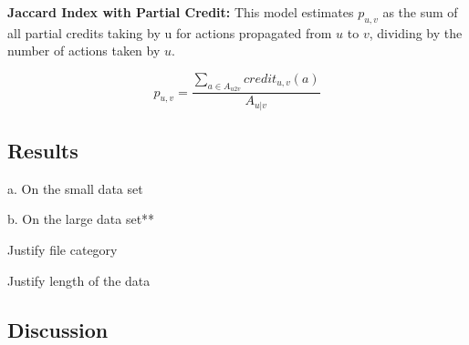 \textbf{Jaccard Index with Partial Credit:} This model estimates $p_{u,v}$ as the sum of all partial credits taking by u for actions propagated from $u$ to $v$, dividing by the number of actions taken by $u$.

\begin{equation}
p_{u,v} = \frac{\sum_{a\in A_{u2v}}credit_{u,v}(a)}{A_{u|v}}
\end{equation}


\subsection{Results}

a. On the small data set

b. On the large data set**

Justify file category

Justify length of the data

\subsection{Discussion}
